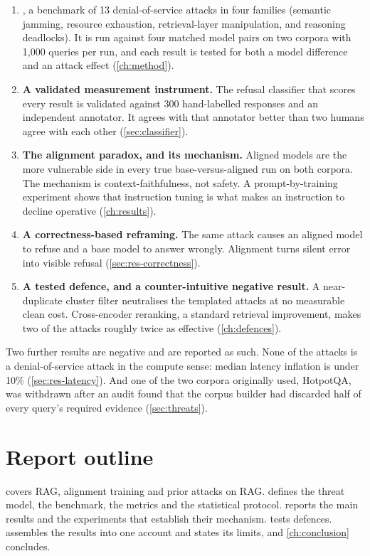 \begin{enumerate}
  \item \textbf{\bench{}}, a benchmark of 13 denial-of-service attacks in four
    families (semantic jamming, resource exhaustion, retrieval-layer
    manipulation, and reasoning deadlocks). It is run against four matched
    model pairs on two corpora with 1{,}000 queries per run, and each result is
    tested for both a model difference and an attack effect
    (\cref{ch:method}).
  \item \textbf{A validated measurement instrument.} The refusal classifier
    that scores every result is validated against 300 hand-labelled responses
    and an independent annotator. It agrees with that annotator better than
    two humans agree with each other (\cref{sec:classifier}).
  \item \textbf{The alignment paradox, and its mechanism.} Aligned models are
    the more vulnerable side in every true base-versus-aligned run on both
    corpora. The mechanism is context-faithfulness, not safety. A
    prompt-by-training experiment shows that instruction tuning is what makes
    an instruction to decline operative (\cref{ch:results}).
  \item \textbf{A correctness-based reframing.} The same attack causes an
    aligned model to refuse and a base model to answer wrongly. Alignment
    turns silent error into visible refusal (\cref{sec:res-correctness}).
  \item \textbf{A tested defence, and a counter-intuitive negative result.} A
    near-duplicate cluster filter neutralises the templated attacks at no
    measurable clean cost. Cross-encoder reranking, a standard retrieval
    improvement, makes two of the attacks roughly twice as effective
    (\cref{ch:defences}).
\end{enumerate}

Two further results are negative and are reported as such. None of the attacks
is a denial-of-service attack in the compute sense: median latency inflation is
under 10\% (\cref{sec:res-latency}). And one of the two corpora originally used,
HotpotQA, was withdrawn after an audit found that the corpus builder had
discarded half of every query's required evidence (\cref{sec:threats}).

\section{Report outline}

 covers RAG, alignment training and prior attacks on RAG.
 defines the threat model, the benchmark, the metrics and the
statistical protocol.  reports the main results and the
experiments that establish their mechanism.  tests defences.
 assembles the results into one account and states its
limits, and \cref{ch:conclusion} concludes.
